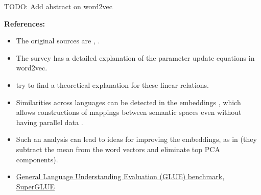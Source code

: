 \documentclass[11pt, a4paper]{amsart}
\begin{document}
TODO: Add abstract on word2vec

\noindent \textbf{References:}
\begin{itemize}
	\item The original sources are
	\cite{DBLP:journals/corr/abs-1301-3781},
	\cite{DBLP:journals/corr/MikolovSCCD13}.
	\item The survey \cite{DBLP:journals/corr/Rong14} has a detailed explanation of the parameter update equations in word2vec.
    \item \cite{DBLP:journals/corr/abs-1901-09813} try to find a theoretical explanation for these linear relations.
    \item Similarities across languages can be detected in the embeddings \cite{DBLP:journals/corr/MikolovLS13}, which allows constructions of mappings between semantic spaces even without having parallel data \cite{DBLP:journals/corr/abs-1710-04087}.
    \item Such an analysis can lead to ideas for improving the embeddings, as in \cite{DBLP:journals/corr/MuBV17} (they subtract the mean from the word vectors and eliminate top PCA components).
    \item \href{https://gluebenchmark.com/}{General Language Understanding Evaluation (GLUE) benchmark}, \href{https://super.gluebenchmark.com/}{SuperGLUE}
\end{itemize}
\end{document}
